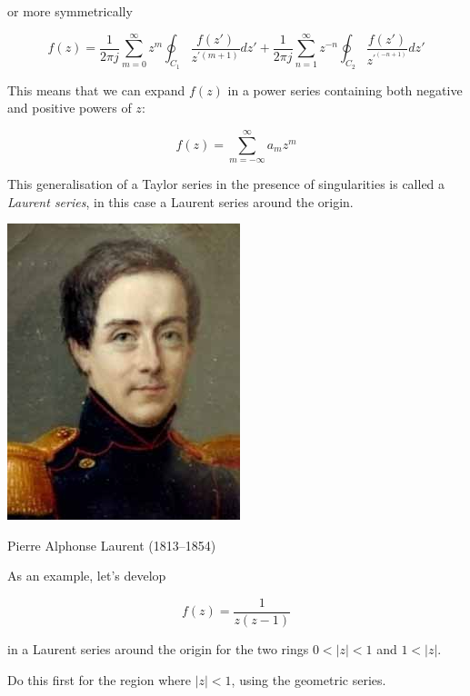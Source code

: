 or more symmetrically

\begin{equation}
f(z)=\frac{1}{2 \pi j } \sum_{m=0}^{\infty} z^m \oint_{{C}_1} \frac{f(z')}{z^{\prime (m+1)}} dz' + \frac{1}{2 \pi j } \sum_{n=1}^{\infty} z ^ {-n} \oint_{{C}_2} \frac{f(z')}{z^{\prime^ {(-n+1)}}} dz'
\label{eq-laurent-int}
\end{equation} 

This means that we can expand $f(z)$ in a power series containing both negative and positive powers of $z$:

\begin{equation}
f(z)= \sum_{m=-\infty}^{\infty} a_m z^m
\end{equation} 

This generalisation of a Taylor series in the presence of singularities is called a \emph{Laurent series}, in this case a Laurent series around the origin.

\begin{marginfigure}[-.5cm]
  \includegraphics{complex/figures/pierre_laurent}
  \caption{Pierre Alphonse Laurent (1813–1854)}
\end{marginfigure}

As an example, let's develop

$$f(z)=\frac{1}{z(z-1)}$$

in a Laurent series around the origin for the two rings $0 < | z | < 1$ and $ 1 < |z|$.

\begin{cue}
Do this first for the region where  $| z | < 1$, using the geometric series.
\end{cue}

